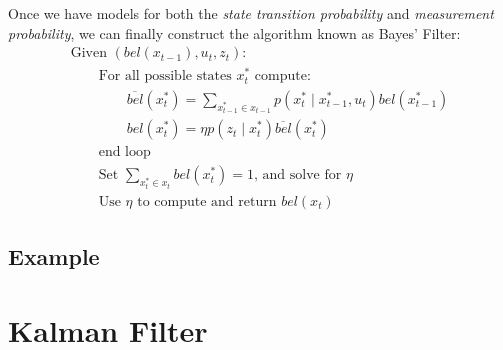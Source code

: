 Once we have models for both the \textit{state transition probability} and \textit{measurement probability}, we can finally construct the algorithm known as Bayes' Filter:
\begin{multline}
\text{Given } (bel(x_{t-1}), u_t, z_t): \\
\qquad \text{For all possible states } x_t^* \text{ compute:} \\
\qquad \qquad \overline{bel}(x_t^*) = \sum\limits_{x_{t-1}^* \in x_{t-1}} p(x_t^* \mathbin{\vert} x_{t-1}^*, u_t) bel(x_{t-1}^*) \\
\qquad \qquad bel(x_t^*) = \eta p(z_t \mathbin{\vert} x_t^*) \overline{bel}(x_t^*) \\
\qquad \text{end loop} \\
\qquad \text{Set } \sum\limits_{x_t^* \in x_t} bel(x_t^*) = 1 \text{, and solve for } \eta \\
\qquad \text{Use } \eta \text{ to compute and return } bel(x_t)
\end{multline}

\subsection{Example}


\section{Kalman Filter}